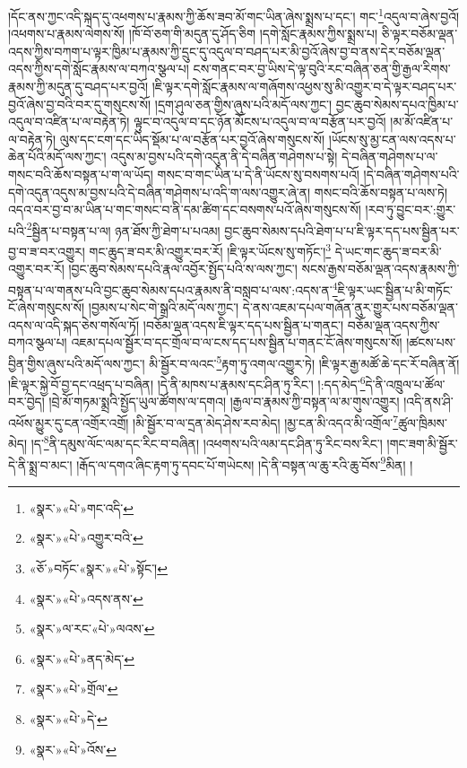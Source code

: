 །དོང་ནས་ཀྱང་འདི་སྐད་དུ་འཕགས་པ་རྣམས་ཀྱི་ཆོས་ཟབ་མོ་གང་ཡིན་ཞེས་སྨྲས་པ་དང་། གང་\footnote{«སྣར་»«པེ་»གང་འདི་}འདུལ་བ་ཞེས་བྱའོ། །འཕགས་པ་རྣམས་ལེགས་སོ། །ཁོ་བོ་ཅག་གི་མདུན་དུ་ཤོད་ཅིག །དགེ་སློང་རྣམས་ཀྱིས་སྨྲས་པ། ཅི་ལྟར་བཅོམ་ལྡན་འདས་ཀྱིས་བཀག་པ་ལྟར་ཁྱིམ་པ་རྣམས་ཀྱི་དྲུང་དུ་འདུལ་བ་བཤད་པར་མི་བྱའོ་ཞེས་བྱ་བ་ནས་དེར་བཅོམ་ལྡན་འདས་ཀྱིས་དགེ་སློང་རྣམས་ལ་བཀའ་སྩལ་པ། ངས་གནང་བར་བྱ་ཡིས་དེ་ལྟ་བུའི་རང་བཞིན་ཅན་གྱི་རྒྱལ་རིགས་རྣམས་ཀྱི་མདུན་དུ་བཤད་པར་བྱའོ། །ཇི་ལྟར་དགེ་སློང་རྣམས་ལ་གཞོགས་འཕྱས་སུ་མི་འགྱུར་བ་དེ་ལྟར་བཤད་པར་བྱའོ་ཞེས་བྱ་བའི་བར་དུ་གསུངས་སོ། །དྲག་ཤུལ་ཅན་གྱིས་ཞུས་པའི་མདོ་ལས་ཀྱང་། བྱང་ཆུབ་སེམས་དཔའ་ཁྱིམ་པ་འདུལ་བ་འཛིན་པ་ལ་བརྟེན་ཏེ། ལྟུང་བ་འདུལ་བ་དང་ཉོན་མོངས་པ་འདུལ་བ་ལ་བརྩོན་པར་བྱའོ། །མ་མོ་འཛིན་པ་ལ་བརྟེན་ཏེ། ལུས་དང་ངག་དང་ཡིད་སྡོམ་པ་ལ་བརྩོན་པར་བྱའོ་ཞེས་གསུངས་སོ། །ཡོངས་སུ་མྱ་ངན་ལས་འདས་པ་ཆེན་པོའི་མདོ་ལས་ཀྱང་། འདུས་མ་བྱས་པའི་དགེ་འདུན་ནི་དེ་བཞིན་གཤེགས་པ་སྟེ། དེ་བཞིན་གཤེགས་པ་ལ་གསང་བའི་ཆོས་བསྟན་པ་ག་ལ་ཡོད། གསང་བ་གང་ཡིན་པ་དེ་ནི་ཡོངས་སུ་བསགས་པའོ། །དེ་བཞིན་གཤེགས་པའི་དགེ་འདུན་འདུས་མ་བྱས་པའི་དེ་བཞིན་གཤེགས་པ་འདི་ག་ལས་འགྱུར་ཞེ་ན། གསང་བའི་ཆོས་བསྟན་པ་ལས་ཏེ། འདའ་བར་བྱ་བ་མ་ཡིན་པ་གང་གསང་བ་ནི་དམ་ཚིག་དང་བསགས་པའོ་ཞེས་གསུངས་སོ། །རབ་ཏུ་བྱུང་བར་:གྱུར་པའི་\footnote{«སྣར་»«པེ་»འགྱུར་བའི་}སྦྱིན་པ་བསྟན་པ་ལ། ཉན་ཐོས་ཀྱི་ཐེག་པ་པའམ། བྱང་ཆུབ་སེམས་དཔའི་ཐེག་པ་པ་ཇི་ལྟར་དད་པས་སྦྱིན་པར་བྱ་བ་ཟ་བར་འགྱུར། གང་ཆུད་ཟ་བར་མི་འགྱུར་བར་རོ། །ཇི་ལྟར་ཡོངས་སུ་གཏོང་།\footnote{«ཅོ་»བཏོང་«སྣར་»«པེ་»སྟོང་།} དེ་ཡང་གང་ཆུད་ཟ་བར་མི་འགྱུར་བར་རོ། །བྱང་ཆུབ་སེམས་དཔའི་རྣལ་འབྱོར་སྤྱོད་པའི་ས་ལས་ཀྱང་། སངས་རྒྱས་བཅོམ་ལྡན་འདས་རྣམས་ཀྱི་བསྟན་པ་ལ་གནས་པའི་བྱང་ཆུབ་སེམས་དཔའ་རྣམས་ནི་བསླབ་པ་ལས་:འདས་ན་\footnote{«སྣར་»«པེ་»འདས་ནས་}ཇི་ལྟར་ཡང་སྦྱིན་པ་མི་གཏོང་ངོ་ཞེས་གསུངས་སོ། །བྱམས་པ་སེང་གེ་སྒྲའི་མདོ་ལས་ཀྱང་། དེ་ནས་འཇམ་དཔལ་གཞོན་ནུར་གྱུར་པས་བཅོམ་ལྡན་འདས་ལ་འདི་སྐད་ཅེས་གསོལ་ཏོ། །བཅོམ་ལྡན་འདས་ཇི་ལྟར་དད་པས་སྦྱིན་པ་གནང་། བཅོམ་ལྡན་འདས་ཀྱིས་བཀའ་སྩལ་པ། འཇམ་དཔལ་སྦྱོར་བ་དང་གྲོལ་བ་ལ་ངས་དད་པས་སྦྱིན་པ་གནང་ངོ་ཞེས་གསུངས་སོ། །ཚངས་པས་བྱིན་གྱིས་ཞུས་པའི་མདོ་ལས་ཀྱང་། མི་སྦྱོར་བ་ལའང་\footnote{«སྣར་»ལ་རང་«པེ་»ལའས་}རྟག་ཏུ་འགལ་འགྱུར་ཏེ། །ཇི་ལྟར་རྒྱ་མཚོ་ཆེ་དང་རོ་བཞིན་ནོ། །ཇི་ལྟར་སྐྱེ་བོ་བྱ་དང་འཕྲད་པ་བཞིན། །དེ་ནི་མཁས་པ་རྣམས་དང་ཤིན་ཏུ་རིང་། །:དད་མེད་\footnote{«སྣར་»«པེ་»ནད་མེད་}དེ་ནི་འཁྲུལ་པ་ཚོལ་བར་བྱེད། །བྲེ་མོ་གཏམ་སྨྲའི་སྤྱོད་ཡུལ་ཚོགས་ལ་དགའ། །རྒྱལ་བ་རྣམས་ཀྱི་བསྟན་ལ་མ་གུས་འགྱུར། །འདི་ནས་ཤི་འཕོས་མྱུར་དུ་ངན་འགྲོར་འགྲོ། །མི་སྦྱོར་བ་ལ་དྲན་མེད་ཤེས་རབ་མེད། །མྱ་ངན་མི་འདའ་མི་འགྲོལ་\footnote{«སྣར་»«པེ་»གྲོལ་}ཚུལ་ཁྲིམས་མེད། །ད་\footnote{«སྣར་»«པེ་»དེ་}ནི་དམུས་ལོང་ལམ་དང་རིང་བ་བཞིན། །འཕགས་པའི་ལམ་དང་ཤིན་ཏུ་རིང་བས་རིང་། །གང་ཟག་མི་སྦྱོར་དེ་ནི་སྨྲ་བ་མང་། །རྒོད་ལ་དགའ་ཞིང་རྟག་ཏུ་དབང་པོ་གཡེངས། །དེ་ནི་བསྟན་ལ་ཆུ་རའི་ཆུ་བོས་\footnote{«སྣར་»«པེ་»འོས་}མིན། །

